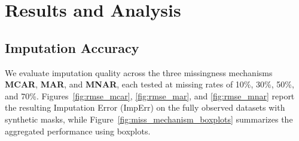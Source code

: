 \documentclass[times, review, 10pt]{elsarticle}
\begin{document}
    






\section{Results and Analysis}



\subsection{Imputation Accuracy}
We evaluate imputation quality across the three missingness mechanisms \textbf{MCAR}, \textbf{MAR}, and \textbf{MNAR}, each tested at missing rates of 10\%, 30\%, 50\%, and 70\%.
Figures~\ref{fig:rmse_mcar}, \ref{fig:rmse_mar}, and \ref{fig:rmse_mnar} report the resulting Imputation Error (ImpErr) on the fully observed
datasets with synthetic masks, while Figure~\ref{fig:miss_mechanism_boxplots} summarizes the aggregated performance using boxplots.
\end{document}
